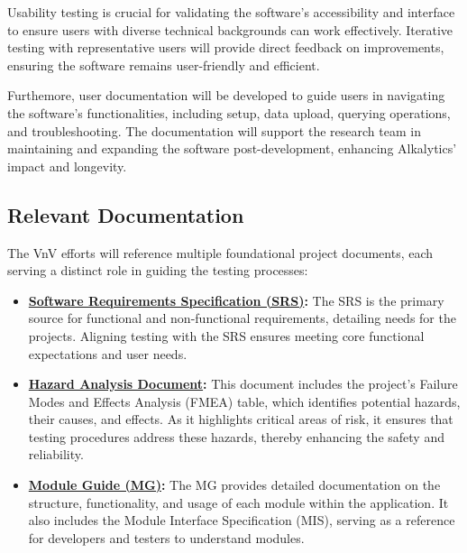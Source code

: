 \documentclass[12pt, titlepage]{article}
\begin{document}
\noindent Usability testing is crucial for validating the software's
accessibility and interface to ensure users with diverse technical backgrounds
can work effectively. Iterative testing with representative users will provide
direct feedback on improvements, ensuring the software remains user-friendly and
efficient. \newline 

\noindent Furthemore, user documentation will be developed to guide users in
navigating the software's functionalities, including setup, data upload,
querying operations, and troubleshooting. The documentation will support the
research team in maintaining and expanding the software post-development,
enhancing Alkalytics' impact and longevity.

\subsection{Relevant Documentation}

The VnV efforts will reference multiple foundational project documents, each
serving a distinct role in guiding the testing processes:

\begin{itemize}
    \item
    \textbf{\href{https://github.com/SumanyaG/Alkalytics/blob/f856af96669275cc29428a8f2cd4b863e4523ff6/docs/SRS/SRS.pdf}{Software
    Requirements Specification (SRS)}:} The SRS is the primary source for
    functional and non-functional requirements, detailing needs for the
    projects. Aligning testing with the SRS ensures meeting core functional
    expectations and user needs.
    
    \item
    \textbf{\href{https://github.com/SumanyaG/Alkalytics/blob/main/docs/HazardAnalysis/HazardAnalysis.pdf}{Hazard
    Analysis Document}:} This document includes the project's Failure Modes and
    Effects Analysis (FMEA) table, which identifies potential hazards, their
    causes, and effects. As it highlights critical areas of risk, it ensures
    that testing procedures address these hazards, thereby enhancing the safety
    and reliability.

    \item
    \textbf{\href{https://github.com/SumanyaG/Alkalytics/blob/main/docs/Design/MG.pdf}{Module
    Guide (MG)}:} The MG provides detailed documentation on the structure,
    functionality, and usage of each module within the application. It also
    includes the Module Interface Specification (MIS), serving as a reference
    for developers and testers to understand modules.

\end{itemize}
\end{document}
